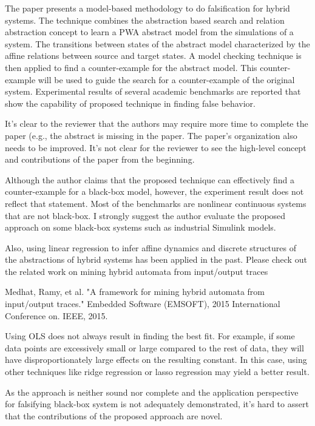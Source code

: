 The paper presents a model-based methodology to do falsification for hybrid
systems. The technique combines the abstraction based search and relation
abstraction concept to learn a PWA abstract model from the simulations of a
system. The transitions between states of the abstract model characterized by
the affine relations between source and target states. A model checking
technique is then applied to find a counter-example for the abstract model.
This counter-example will be used to guide the search for a counter-example of
the original system. Experimental results of several academic benchmarks are
reported that show the capability of proposed technique in finding false
behavior.

It's clear to the reviewer that the authors may require more time to complete
the paper (e.g., the abstract is missing in the paper. The paper's organization
also needs to be improved. It's not clear for the reviewer to see the
high-level concept and contributions of the paper from the beginning.

Although the author claims that the proposed technique can effectively find a
counter-example for a black-box model, however, the experiment result does not
reflect that statement. Most of the benchmarks are nonlinear continuous systems
that are not black-box. I strongly suggest the author evaluate the proposed
approach on some black-box systems such as industrial Simulink models.

Also, using linear regression to infer affine dynamics and discrete structures
of the abstractions of hybrid systems has been applied in the past. Please
check out the related work on mining hybrid automata from input/output traces

Medhat, Ramy, et al. "A framework for mining hybrid automata from input/output
traces." Embedded Software (EMSOFT), 2015 International Conference on. IEEE,
2015.

Using OLS does not always result in finding the best fit. For example, if some
data points are excessively small or large compared to the rest of data, they
will have disproportionately large effects on the resulting constant. In this
case, using other techniques like ridge regression or lasso regression may
yield a better result.

As the approach is neither sound nor complete and the application perspective
for falsifying black-box system is not adequately demonstrated, it's hard to
assert that the contributions of the proposed approach are novel.

